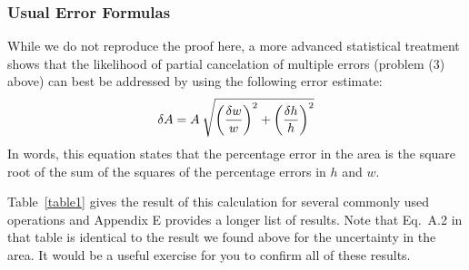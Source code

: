 \subsubsection*{Usual Error Formulas}
\label{par:error.formula}
While we do not reproduce the proof here, a
more advanced statistical treatment shows that the likelihood of
partial cancelation of multiple errors (problem (3) above) can
best be addressed by using the following error estimate: 
\[
\delta A = A \: \sqrt{ \left({{\delta w} \over {w}} \right)^{2} + \left(
           {{\delta h} \over {h}} \right)^{2} }
\]
In words, this equation states that the percentage error in the
area is the square root of the sum of the squares of the
percentage errors in $h$ and $w$.  %

Table~\ref{table1} gives the result of this
calculation for several commonly used operations and Appendix E
provides a longer list of results.  Note that Eq.~A.2 in
that table is identical to the result we found above for the
uncertainty in the area.
It would be a useful exercise for you to confirm all of these results.

